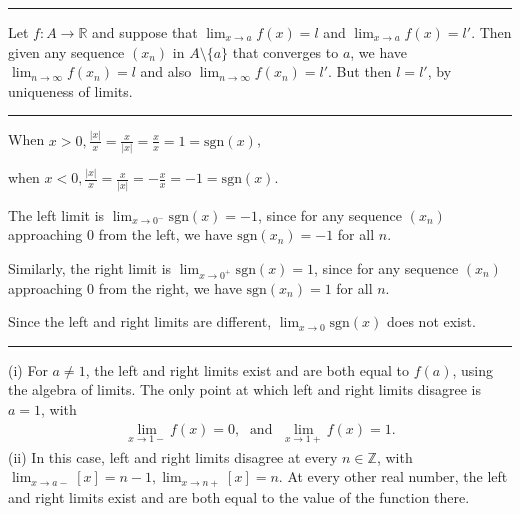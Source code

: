 \documentclass[letterpaper,10pt,english]{jupyterBook}
\begin{document}
\bigskip\hrule\bigskip


\sphinxAtStartPar
{\hyperref[\detokenize{Problems:id6}]{}} Let \(f:A\to \mathbb{R}\) and suppose that \(\lim_{x \rightarrow a} f(x) = l\) and \(\lim_{x \rightarrow a} f(x) = l'\). Then given any sequence \((x_{n})\) in \(A \setminus \{a\}\) that converges to \(a\), we have \(\lim_{n\rightarrow\infty} f(x_{n}) = l\) and also \(\lim_{n\rightarrow\infty} f(x_{n}) = l'\). But then \(l = l'\), by uniqueness of limits.


\bigskip\hrule\bigskip


\sphinxAtStartPar
{\hyperref[\detokenize{Problems:id7}]{}}

When \(x > 0, \displaystyle\frac{|x|}{x} = \displaystyle\frac{x}{|x|} = \displaystyle\frac{x}{x} = 1 = \text{sgn}(x)\),

when \(x < 0, \displaystyle\frac{|x|}{x} = \displaystyle\frac{x}{|x|} = -\displaystyle\frac{x}{x} = -1 = \text{sgn}(x)\).

The left limit is \(\displaystyle\lim_{x \rightarrow 0^-} \text{sgn}(x) = -1\), since for any sequence \((x_n)\) approaching \(0\) from the left, we have \(\text{sgn}(x_n) = -1\) for all \(n\).

Similarly, the right limit is \(\displaystyle\lim_{x \rightarrow 0^+} \text{sgn}(x) = 1\),  since for any sequence \((x_n)\) approaching \(0\) from the right, we have \(\text{sgn}(x_n) = 1\) for all \(n\).

Since the left and right limits are different, \(\displaystyle\lim_{x \rightarrow 0}\text{sgn}(x)\) does not exist.


\bigskip\hrule\bigskip


\sphinxAtStartPar
{\hyperref[\detokenize{Problems:id8}]{}} 

\sphinxAtStartPar
(i) For \(a\neq 1\), the left and right limits exist and are both equal to \(f(a)\), using the algebra of limits. The only point at which left and right limits disagree is \(a = 1\), with
\begin{equation*}
\begin{split}
\lim_{x \rightarrow 1-}f(x) = 0, \; \text{ and } \; \lim_{x \rightarrow 1+}f(x) = 1.
\end{split}
\end{equation*}
\sphinxAtStartPar
(ii) In this case, left and right limits disagree at every \(n \in \mathbb{Z}\), with \(\lim_{x \rightarrow a-}[x] = n-1, \lim_{x \rightarrow n+}[x] = n\). At every other real number, the left and right limits exist and are both equal to the value of the function there.
\end{document}
